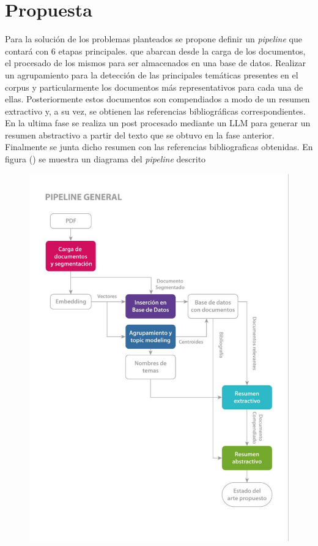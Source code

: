 \chapter{Propuesta}\label{chapter:proposal}
    Para la solución de los problemas planteados se propone definir un \emph{pipeline} que contará con 6 etapas principales.
    que abarcan desde la carga de los documentos, el procesado de los mismos para ser almacenados en una base de datos. Realizar un agrupamiento para la detección de las principales temáticas presentes en el corpus y particularmente los documentos más representativos para cada una de ellas. Posteriormente estos documentos son compendiados a modo de un resumen extractivo y, a su vez, se obtienen las referencias bibliográficas correspondientes. En la ultima fase se realiza un post procesado mediante un LLM para generar un resumen abstractivo a partir del texto que se obtuvo en la fase anterior. Finalmente se junta dicho resumen con las referencias bibliograficas obtenidas. En figura () se muestra un diagrama del \emph{pipeline} descrito

    \begin{figure}[H]    
        \centering
        \includegraphics[scale = 1]{Figures/pipeline_general.jpg}
        \caption*{}
    \end{figure}
    

